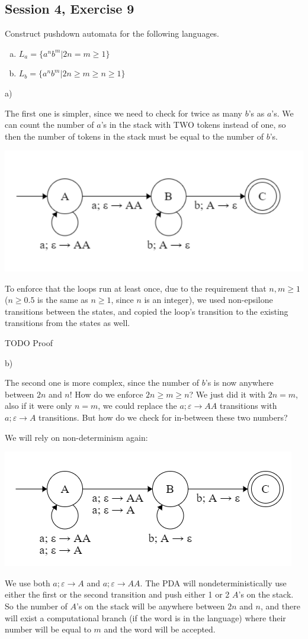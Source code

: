 \subsection{Session 4, Exercise 9}


Construct pushdown automata for the following languages.

\begin{enumerate}[a)]
\item $L_a = \{a^nb^m | 2n = m \geq{} 1\}$
\item $L_b = \{a^nb^m | 2n \geq{} m \geq{} n \geq{} 1\}$
\end{enumerate}


a)

The first one is simpler, since we need to check for twice as many $b$'s as $a$'s. We can count the number of $a$'s in the stack with TWO tokens instead of one, so then the number of tokens in the stack must be equal to the number of $b$'s.

\includegraphics[width=0.5\linewidth]{04/4_9_a.png}

To enforce that the loops run at least once, due to the requirement that $n,m\geq{}1$ ($n\geq{}0.5$ is the same as $n\geq{}1$, since $n$ is an integer), we used non-epsilone transitions between the states, and copied the loop's transition to the existing transitions from the states as well.

TODO Proof

b)

The second one is more complex, since the number of $b$'s is now anywhere between $2n$ and $n$! How do we enforce $2n \geq{} m \geq{} n$? We just did it with $2n = m$, also if it were only $n = m$, we could replace the $a; \varepsilon \rightarrow AA$ transitions with  $a; \varepsilon \rightarrow A$ transitions. But how do we check for in-between these two numbers?

We will rely on non-determinism again:

\includegraphics[width=0.5\linewidth]{04/4_9_b.png}

We use both $a; \varepsilon \rightarrow A$ and $a; \varepsilon \rightarrow AA$. The PDA will nondeterministically use either the first or the second transition and push either 1 or 2 $A$'s on the stack. So the number of $A$'s on the stack will be anywhere between $2n$ and $n$, and there will exist a computational branch (if the word is in the language) where their number will be equal to $m$ and the word will be accepted.